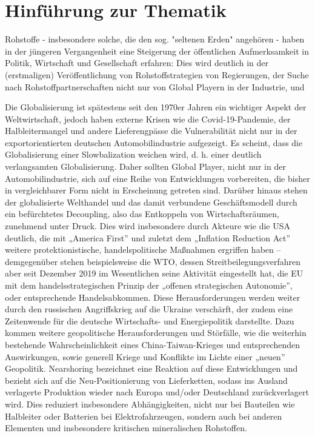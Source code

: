 \documentclass[12pt,a4paper,oneside]{book} %
\begin{document}
	
	
	
	\tableofcontents
	
	\chapter{Hinführung zur Thematik}
	
	Rohstoffe - insbesondere solche, die den sog. "seltenen Erden" angehören - haben in der jüngeren Vergangenheit eine Steigerung der öffentlichen Aufmerksamkeit in Politik, Wirtschaft und Gesellschaft erfahren: Dies wird deutlich in der (erstmaligen) Veröffentlichung von Rohstoffstrategien von Regierungen, der Suche nach Rohstoffpartnerschaften nicht nur von Global Playern in der Industrie, und 
	
	Die Globalisierung ist spätestens seit den 1970er Jahren ein wichtiger Aspekt der Weltwirtschaft, jedoch haben externe Krisen wie die Covid-19-Pandemie, der Halbleitermangel und andere Lieferengpässe die Vulnerabilität nicht nur in der exportorientierten deutschen Automobilindustrie aufgezeigt. Es scheint, dass die Globalisierung einer Slowbalization weichen wird, d. h. einer deutlich verlangsamten Globalisierung. Daher sollten Global Player, nicht nur in der Automobilindustrie, sich auf eine Reihe von Entwicklungen vorbereiten, die bisher in vergleichbarer Form nicht in Erscheinung getreten sind.
	Darüber hinaus stehen der globalisierte Welthandel und das damit verbundene Geschäftsmodell durch ein befürchtetes Decoupling, also das Entkoppeln von Wirtschaftsräumen, zunehmend unter Druck. Dies wird insbesondere durch Akteure wie die USA deutlich, die mit „America First” und zuletzt dem „Inflation Reduction Act” weitere protektionistische, handelspolitische Maßnahmen ergriffen haben – demgegenüber stehen beispielsweise die WTO, dessen Streitbeilegungsverfahren aber seit Dezember 2019 im Wesentlichen seine Aktivität eingestellt hat, die EU mit dem handelsstrategischen Prinzip der „offenen strategischen Autonomie”, oder entsprechende Handelsabkommen. Diese Herausforderungen werden weiter durch den russischen Angriffskrieg auf die Ukraine verschärft, der zudem eine Zeitenwende für die deutsche Wirtschafts- und Energiepolitik darstellte. Dazu kommen weitere geopolitische Herausforderungen und Störfälle, wie die weiterhin bestehende Wahrscheinlichkeit eines China-Taiwan-Krieges und entsprechenden Auswirkungen, sowie generell Kriege und Konflikte im Lichte einer „neuen” Geopolitik. Nearshoring bezeichnet eine Reaktion auf diese Entwicklungen und bezieht sich auf die Neu-Positionierung von Lieferketten, sodass ins Ausland verlagerte Produktion wieder nach Europa und/oder Deutschland zurückverlagert wird. Dies reduziert insbesondere Abhängigkeiten, nicht nur bei Bauteilen wie Halbleiter oder Batterien bei Elektrofahrzeugen, sondern auch bei anderen Elementen und insbesondere kritischen mineralischen Rohstoffen.
	
\end{document}
